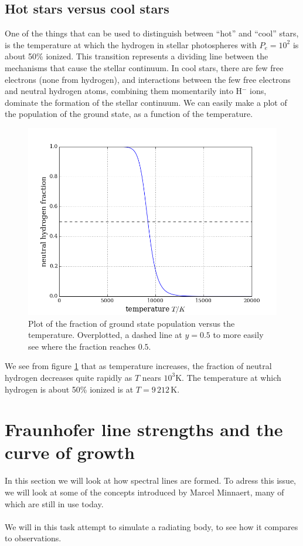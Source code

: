 \documentclass{article}
\begin{document}
\subsection{Hot stars versus cool stars}
One of the things that can be used to distinguish between ``hot'' and ``cool'' stars, is the temperature at which the hydrogen in stellar photospheres with $P_e = 10^2$ is about 50\% ionized. This transition represents a dividing line between the mechanisms that cause the stellar continuum. In cool stars, there are few free electrons (none from hydrogen), and interactions between the few free electrons and neutral hydrogen atoms, combining them momentarily into H$^-$ ions, dominate the formation of the stellar continuum. We can easily make a plot of the population of the ground state, as a function of the temperature.
\begin{figure}[H]
  \centering
  \includegraphics[scale=0.5]{ssa_2_10.png}
  \caption{Plot of the fraction of ground state population versus the temperature. Overplotted, a dashed line at $y=0.5$ to more easily see where the fraction reaches $0.5$.}
  \label{fig:neutral_hydrogen}
\end{figure}
We see from figure \ref{fig:neutral_hydrogen} that as temperature increases, the fraction of neutral hydrogen decreases quite rapidly as $T$ nears $10^3$K. The temperature at which hydrogen is about 50\% ionized is at $T = 9\,212\,$K.

\section{Fraunhofer line strengths and the curve of growth}
In this section we will look at how spectral lines are formed. To adress this issue, we will look at some of the concepts introduced by Marcel Minnaert, many of which are still in use today.\\\\
We will in this task attempt to simulate a radiating body, to see how it compares to observations.
\end{document}

